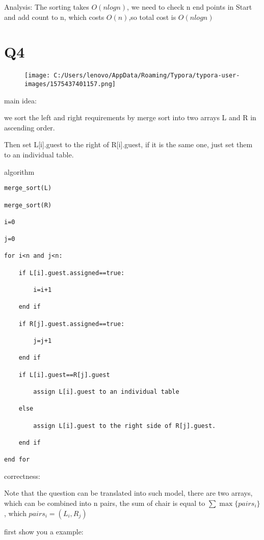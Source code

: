 \documentclass[]{article}
\begin{document}
Analysis: The sorting takes \(O(nlogn)\), we need to check n end points
in Start and add count to n, which costs \(O(n)\),so total cost is
\(O(nlogn) \)

\section{Q4}\label{header-n34}

\begin{figure}
\centering
\texttt{[image: C:/Users/lenovo/AppData/Roaming/Typora/typora-user-images/1575437401157.png]}
\caption{}
\end{figure}

main idea:

we sort the left and right requirements by merge sort into two arrays L
and R in ascending order.

Then set L{[}i{]}.guest to the right of R{[}i{]}.guest, if it is the
same one, just set them to an individual table.

algorithm

\begin{verbatim}
merge_sort(L)

merge_sort(R)

i=0

j=0

for i<n and j<n:

	if L[i].guest.assigned==true:

		i=i+1

	end if

	if R[j].guest.assigned==true:

		j=j+1

	end if

	if L[i].guest==R[j].guest

 		assign L[i].guest to an individual table

	else

 		assign L[i].guest to the right side of R[j].guest.

	end if 

end for 
\end{verbatim}

correctness:

Note that the question can be translated into such model, there are two
arrays, which can be combined into n pairs, the sum of chair is equal to
\(\sum\max\{pairs_i\}\), which \(pairs_i=(L_i,R_j)\)

first show you a example:
\end{document}
